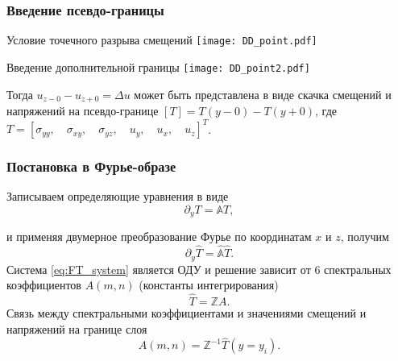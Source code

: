 \begin{frame}
    \frametitle{Введение псевдо-границы}
    \begin{minipage}[t]{0.47\linewidth}
        \footnotesize{Условие точечного разрыва смещений}
        \texttt{[image: DD\_point.pdf]}
    \end{minipage}
    \hfill
    \begin{minipage}[t]{0.47\linewidth}
        \footnotesize{Введение дополнительной границы}
        \texttt{[image: DD\_point2.pdf]}
    \end{minipage}
    Тогда $u_{z-0} - u_{z+0} = \Delta u$ может быть представлена в виде скачка смещений и напряжений на псевдо-границе $\left[ T \right] = T(y-0) - T(y+0)$, где $T = \left[\sigma_{yy} , \quad \sigma_{xy} , \quad \sigma_{yz} , \quad u_{y} , \quad u_{x} , \quad u_{z}\right]^T$.
\end{frame}

\begin{frame}
    \frametitle{Постановка в Фурье-образе}
    Записываем определяющие уравнения в виде
    \begin{equation}
        \label{eq:separate}
        \partial_{y} T = \mathbb{A}T,
    \end{equation}

    и применяя двумерное преобразование Фурье по координатам $x$ и $z$, получим
    \begin{equation}
        \label{eq:FT_system}
        \partial_y \hat{T} = \hat{\mathbb{A}} \hat{T}.
    \end{equation}
    Система \eqref{eq:FT_system} является ОДУ и решение зависит от 6 спектральных коэффициентов $A(m,n)$ (константы интегрирования)
    \begin{equation}
        \label{eq:fourier_solution}
        \hat{T} = \mathbb{Z}A.
    \end{equation}
    Связь между спектральными коэффициентами и значениями смещений и напряжений на границе слоя
    \begin{equation}
        A(m,n) = \mathbb{Z}^{-1}\hat{T}(y=y_i).
    \end{equation}
\end{frame}

